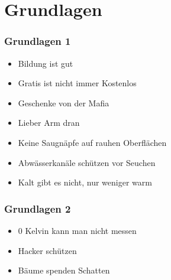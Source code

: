 \section{Grundlagen}

\begin{frame}
	\frametitle{Grundlagen 1}
	\begin{itemize}
		\item Bildung ist gut
		\item Gratis ist nicht immer Kostenlos
		\item Geschenke von der Mafia
		\item Lieber Arm dran
		\item Keine Saugnäpfe auf rauhen Oberflächen
		\item Abwässerkanäle schützen vor Seuchen
		\item Kalt gibt es nicht, nur weniger warm
	\end{itemize}
\end{frame}

\begin{frame}
	\frametitle{Grundlagen 2}
	\begin{itemize}
		\item 0 Kelvin kann man nicht messen
		\item Hacker schützen
		\item Bäume spenden Schatten
	\end{itemize}
\end{frame}
